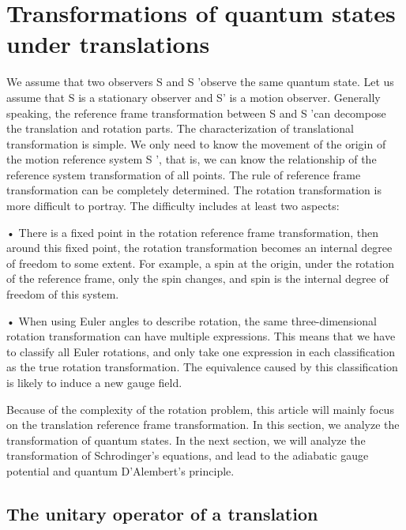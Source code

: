 \documentclass{article}
\begin{document}
    

    \section{Transformations of quantum states under translations}

        We assume that two observers S and S ’observe the same quantum state. Let us assume that S is a stationary observer and S’ is a motion observer. Generally speaking, the reference frame transformation between S and S 'can decompose the translation and rotation parts. The characterization of translational transformation is simple. We only need to know the movement of the origin of the motion reference system S ', that is, we can know the relationship of the reference system transformation of all points. The rule of reference frame transformation can be completely determined. The rotation transformation is more difficult to portray. The difficulty includes at least two aspects:

        • There is a fixed point in the rotation reference frame transformation, then around this fixed point, the rotation transformation becomes an internal degree of freedom to some extent. For example, a spin at the origin, under the rotation of the reference frame, only the spin changes, and spin is the internal degree of freedom of this system.
        
        • When using Euler angles to describe rotation, the same three-dimensional rotation transformation can have multiple expressions. This means that we have to classify all Euler rotations, and only take one expression in each classification as the true rotation transformation. The equivalence caused by this classification is likely to induce a new gauge field.
        
        Because of the complexity of the rotation problem, this article will mainly focus on the translation reference frame transformation. In this section, we analyze the transformation of quantum states. In the next section, we will analyze the transformation of Schrodinger's equations, and lead to the adiabatic gauge potential and quantum D'Alembert's principle.


        
    \subsection{The unitary operator of a translation}
\end{document}
